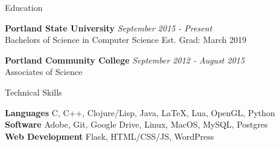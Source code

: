 \documentclass{resume} %
\begin{document}

\begin{rSection}{Education}

{\bf Portland State University} \hfill {\em September 2015 - Present} \\
{Bachelors of Science in Computer Science} \hfill {Est. Grad: March 2019}

{\bf Portland Community College} \hfill {\em September 2012 - August 2015} \\
{Associates of Science} \hfill {}

\end{rSection}


\begin{rSection}{Technical Skills}

{\bf Languages} \hfill {C, C++, Clojure/Lisp, Java, LaTeX, Lua, OpenGL, Python} \\
{\bf Software} \hfill {Adobe, Git, Google Drive, Linux, MacOS, MySQL, Postgres} \\
{\bf Web Development} \hfill {Flask, HTML/CSS/JS, WordPress}

\end{rSection}

\end{document}
